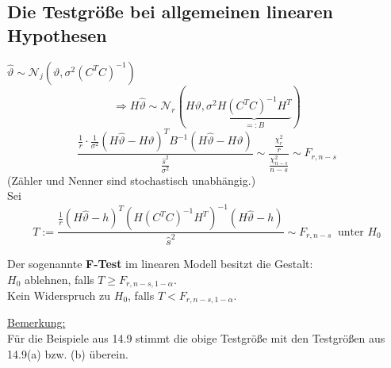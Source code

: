 \documentclass[a4paper,11pt,twoside,titlepage]{article}
\newcommand\NN{ \mathcal{N} } %
\begin{document}
\subsection{Die Testgröße bei allgemeinen linearen Hypothesen}
$\hat\vartheta\sim\NN_j(\vartheta,\sigma^2(C^TC)^{-1})$
\[\Rightarrow H\hat\vartheta\sim\NN_r(H\vartheta,\sigma^2\underbrace{H(C^TC)^{-1}H^T}_{=:B})\]
\[\frac{\frac1r\cdot\frac{1}{\sigma^2}(H\hat\vartheta-H\vartheta)^TB^{-1}(H\hat\vartheta-H\vartheta)}{\frac{\hat s^2}{\sigma^2}}\sim\frac{\frac{\chi_r^2}{r}}{\frac{\chi_{n-s}^2}{n-s}}\sim F_{r,n-s}\]
(Zähler und Nenner sind stochastisch unabhängig.)\\
Sei 
\[T:=\frac{\frac1r(H\hat\vartheta-h)^T(H(C^TC)^{-1}H^T)^{-1}(H\hat\vartheta-h)}{\hat s^2}\sim F_{r,n-s}\ \mbox{ unter }H_0\]

Der sogenannte \textbf{F-Test} im linearen Modell besitzt die Gestalt:\\
$H_0$ ablehnen, falls $T\geq F_{r,n-s,1-\alpha}$.\\
Kein Widerspruch zu $H_0$, falls $T<F_{r,n-s,1-\alpha}$.

\underline{Bemerkung:}\\
Für die Beispiele aus 14.9 stimmt die obige Testgröße mit den Testgrößen aus 14.9(a) bzw. (b) überein. 
\end{document}
